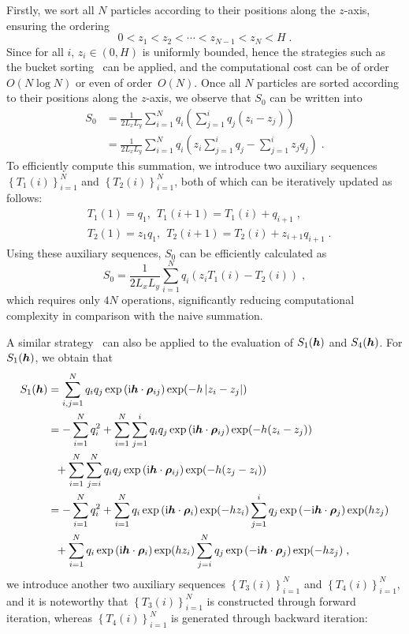 Firstly, we sort all $N$ particles according to their positions along the 
$z$-axis, ensuring the ordering
\begin{equation*}
   0 < z_1 < z_2 <  \cdots <  z_{N - 1}<z_N < H\;.
\end{equation*}
Since for all  $i$, $z_i \in (0, H)$ is uniformly bounded, hence  the strategies such as the bucket sorting~\cite{corwin2004sorting} can be applied, and the computational cost can be of order~$O(N \log{N})$ or even  of order~$O(N)$. 
Once all $N$ particles are sorted according to their positions along the $z$-axis, we observe that $S_0$ can be written into
\begin{align*}
    S_0 
    & = \frac{1}{2 L_xL_y} \sum_{i = 1}^N q_i \left( \sum_{j = 1}^{i }{q_j (z_i - z_j)} \right) \\
    & = \frac{1}{2 L_xL_y} \sum_{i = 1}^N q_i \left( z_i \sum_{j = 1}^{i }q_j - \sum_{j = 1}^{i }z_j q_j  \right) \;.
\end{align*}
To efficiently compute this summation, we introduce two auxiliary sequences  $\left\{T_1(i)\right\}_{i=1}^N$ and $\left\{T_2(i)\right\}_{i=1}^N$, both of which  can be iteratively updated as follows:
\begin{align*}
    &T_1(1)=q_1,~~T_1(i+1)=T_1(i)+q_{i+1}\;,\\
    &T_2(1)=z_1q_1,~~T_2(i+1)=T_2(i)+z_{i+1}q_{i+1}\;.
\end{align*}
Using these auxiliary sequences, 
$S_0$ can be efficiently calculated as
\[
S_0= \frac{1}{2 L_xL_y} \sum_{i = 1}^N q_i \left( z_iT_1(i)-T_2(i)\right)\;,
\]
which requires only 
$4N$ operations, significantly reducing computational complexity in comparison with the naive summation.

A similar strategy~\cite{jiang2021approximating, gan2024fast} can also be applied to the evaluation of $S_1(\boldsymbol{h})$ and $S_4(\boldsymbol{h})$. For $S_1(\boldsymbol{h})$, we obtain that 
\begin{align*}
S_1(\boldsymbol{h})&=\sum_{i,j=1}^Nq_iq_j  \exp{(\mathrm{i} \boldsymbol{h} \cdot \boldsymbol{\rho}_{ij})}\exp(-h\left\lvert z_i-z_j\right\rvert)\\
&=-\sum_{i=1}^Nq_i^2+\sum_{i=1}^N \sum_{j=1}^iq_iq_j  \exp{(\mathrm{i} \boldsymbol{h} \cdot \boldsymbol{\rho}_{ij})}\exp(-h(z_i-z_j))\\
&~~+\sum_{i=1}^N \sum_{j=i}^Nq_iq_j  \exp{(\mathrm{i} \boldsymbol{h} \cdot \boldsymbol{\rho}_{ij})}\exp(-h(z_j-z_i))\\
&= -\sum_{i=1}^Nq_i^2+\sum_{i=1}^N q_i\exp{(\mathrm{i} \boldsymbol{h} \cdot \boldsymbol{\rho}_{i})}\exp(-hz_i)\sum_{j=1}^iq_j\exp{(-\mathrm{i} \boldsymbol{h} \cdot \boldsymbol{\rho}_{j})}\exp(hz_j)\\
&~~+\sum_{i=1}^N q_i\exp{(\mathrm{i} \boldsymbol{h} \cdot \boldsymbol{\rho}_{i})}\exp(hz_i)\sum_{j=i}^Nq_j\exp{(-\mathrm{i} \boldsymbol{h} \cdot \boldsymbol{\rho}_{j})}\exp(-hz_j)\;,
\end{align*}
 we introduce another two auxiliary sequences  $\left\{T_3(i)\right\}_{i=1}^N$ and $\left\{T_4(i)\right\}_{i=1}^N$, and it is noteworthy that $\left\{T_3(i)\right\}_{i=1}^N$ is  constructed through forward iteration, whereas  $\left\{T_4(i)\right\}_{i=1}^N$   is generated through backward iteration:

